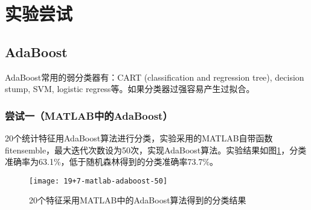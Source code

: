\section{实验尝试}
%
\subsection{AdaBoost}
AdaBoost常用的弱分类器有：CART (classification and regression tree), decision stump, SVM, logistic regress等。如果分类器过强容易产生过拟合。

\subsubsection{尝试一（MATLAB中的AdaBoost）}
20个统计特征用AdaBoost算法进行分类，实验采用的MATLAB自带函数fitensemble，最大迭代次数设为50次，实现AdaBoost算法。实验结果如图\ref{fig:19+7-matlab-adaboost-50}，分类准确率为63.1\%，低于随机森林得到的分类准确率73.7\%。
\begin{figure}[!ht]
\centering
\texttt{[image: 19+7-matlab-adaboost-50]}
\caption{20个特征采用MATLAB中的AdaBoost算法得到的分类结果}
\label{fig:19+7-matlab-adaboost-50}
\end{figure}


